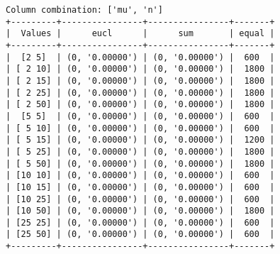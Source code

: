 \documentclass{article}
\begin{document}
\begin{verbatim}
Column combination: ['mu', 'n']
+---------+----------------+----------------+-------+
|  Values |      eucl      |      sum       | equal |
+---------+----------------+----------------+-------+
|  [2 5]  | (0, '0.00000') | (0, '0.00000') |  600  |
| [ 2 10] | (0, '0.00000') | (0, '0.00000') |  1800 |
| [ 2 15] | (0, '0.00000') | (0, '0.00000') |  1800 |
| [ 2 25] | (0, '0.00000') | (0, '0.00000') |  1800 |
| [ 2 50] | (0, '0.00000') | (0, '0.00000') |  1800 |
|  [5 5]  | (0, '0.00000') | (0, '0.00000') |  600  |
| [ 5 10] | (0, '0.00000') | (0, '0.00000') |  600  |
| [ 5 15] | (0, '0.00000') | (0, '0.00000') |  1200 |
| [ 5 25] | (0, '0.00000') | (0, '0.00000') |  1800 |
| [ 5 50] | (0, '0.00000') | (0, '0.00000') |  1800 |
| [10 10] | (0, '0.00000') | (0, '0.00000') |  600  |
| [10 15] | (0, '0.00000') | (0, '0.00000') |  600  |
| [10 25] | (0, '0.00000') | (0, '0.00000') |  600  |
| [10 50] | (0, '0.00000') | (0, '0.00000') |  1800 |
| [25 25] | (0, '0.00000') | (0, '0.00000') |  600  |
| [25 50] | (0, '0.00000') | (0, '0.00000') |  600  |
+---------+----------------+----------------+-------+
\end{verbatim}
\end{document}
